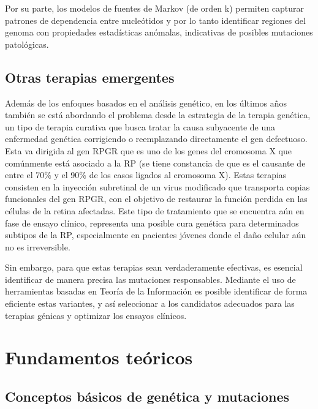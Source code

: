 \documentclass[11pt,spanish,listoffigures,listoftables]{tfgetsinf}
\begin{document}
Por su parte, los modelos de fuentes de Markov (de orden k) permiten capturar patrones de dependencia entre nucleótidos y por lo tanto identificar regiones del genoma con propiedades estadísticas anómalas\cite{VOZ}, indicativas de posibles mutaciones patológicas.

\section{Otras terapias emergentes}

Además de los enfoques basados en el análisis genético, en los últimos años también se está abordando el problema desde la estrategia de la terapia genética, un tipo de terapia curativa que busca tratar la causa subyacente de una enfermedad genética corrigiendo o reemplazando directamente el gen defectuoso. Esta va dirigida al gen RPGR que es uno de los genes del cromosoma X que comúnmente está asociado a la \acs{RP} (se tiene constancia de que es el causante de entre el 70\% y el 90\% de los casos ligados al cromosoma X)\cite{WAN}. Estas terapias consisten en la inyección subretinal de un virus modificado que transporta copias funcionales del gen RPGR, con el objetivo de restaurar la función perdida en las células de la retina afectadas\cite{ZON}. Este tipo de tratamiento que se encuentra aún en fase de ensayo clínico, representa una posible cura genética para determinados subtipos de la \acs{RP}, especialmente en pacientes jóvenes donde el daño celular aún no es irreversible.

Sin embargo, para que estas terapias sean verdaderamente efectivas, es esencial identificar de manera precisa las mutaciones responsables. Mediante el uso de herramientas basadas en Teoría de la Información es posible identificar de forma eficiente estas variantes, y así seleccionar a los candidatos adecuados para las terapias génicas y optimizar los ensayos clínicos.



\chapter{Fundamentos teóricos}

\section{Conceptos básicos de genética y mutaciones}
\end{document}
